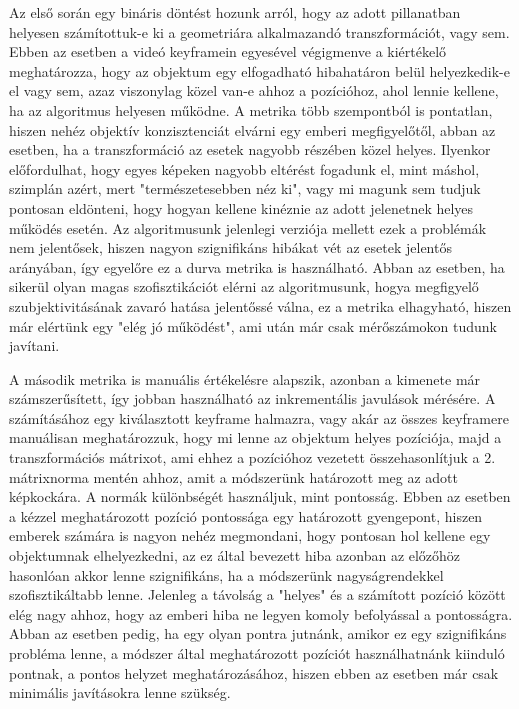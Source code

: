 Az első során egy bináris döntést hozunk arról, hogy az adott pillanatban helyesen számítottuk-e ki a geometriára alkalmazandó transzformációt, vagy sem.
Ebben az esetben a videó keyframein egyesével végigmenve a kiértékelő meghatározza, hogy az objektum egy elfogadható hibahatáron belül helyezkedik-e el vagy sem, azaz viszonylag közel van-e ahhoz a pozícióhoz, ahol lennie kellene, ha az algoritmus helyesen működne.
A metrika több szempontból is pontatlan, hiszen nehéz objektív konzisztenciát elvárni egy emberi megfigyelőtől, abban az esetben, ha a transzformáció az esetek nagyobb részében közel helyes.
Ilyenkor előfordulhat, hogy egyes képeken nagyobb eltérést fogadunk el, mint máshol, szimplán azért, mert "természetesebben néz ki", vagy mi magunk sem tudjuk pontosan eldönteni, hogy hogyan kellene kinéznie az adott jelenetnek helyes működés esetén.
Az algoritmusunk jelenlegi verziója mellett ezek a problémák nem jelentősek, hiszen nagyon szignifikáns hibákat vét az esetek jelentős arányában, így egyelőre ez a durva metrika is használható.
Abban az esetben, ha sikerül olyan magas szofisztikációt elérni az algoritmusunk, hogya megfigyelő szubjektivitásának zavaró hatása jelentőssé válna, ez a metrika elhagyható, hiszen már elértünk egy "elég jó működést", ami után már csak mérőszámokon tudunk javítani.

A második metrika is manuális értékelésre alapszik, azonban a kimenete már számszerűsített, így jobban használható az inkrementális javulások mérésére.
A számításához egy kiválasztott keyframe halmazra, vagy akár az összes keyframere manuálisan meghatározzuk, hogy mi lenne az objektum helyes pozíciója, majd a transzformációs mátrixot, ami ehhez a pozícióhoz vezetett összehasonlítjuk a 2. mátrixnorma mentén ahhoz, amit a módszerünk határozott meg az adott képkockára.
A normák különbségét használjuk, mint pontosság.
Ebben az esetben a kézzel meghatározott pozíció pontossága egy határozott gyengepont, hiszen emberek számára is nagyon nehéz megmondani, hogy pontosan hol kellene egy objektumnak elhelyezkedni, az ez által bevezett hiba azonban az előzőhöz hasonlóan akkor lenne szignifikáns, ha a módszerünk nagyságrendekkel szofisztikáltabb lenne.
Jelenleg a távolság a "helyes" és a számított pozíció között elég nagy ahhoz, hogy az emberi hiba ne legyen komoly befolyással a pontosságra.
Abban az esetben pedig, ha egy olyan pontra jutnánk, amikor ez egy szignifikáns probléma lenne, a módszer által meghatározott pozíciót használhatnánk kiinduló pontnak, a pontos helyzet meghatározásához, hiszen ebben az esetben már csak minimális javításokra lenne szükség.

